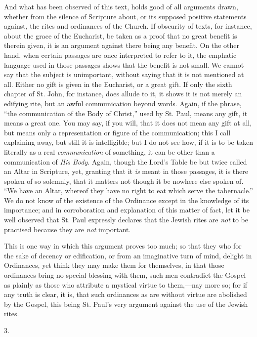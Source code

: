 And what has been observed of this text, holds good of all
arguments drawn, whether from the silence of Scripture about, or its
supposed positive statements against, the rites and ordinances of the
Church. If obscurity of texts, for instance, about the grace of the
Eucharist, be taken as a proof that no great benefit is therein given,
it is an argument against there being any benefit. On the other
hand, when certain passages are once interpreted to refer to it, the
emphatic language used in those passages shows that the benefit is not
small. We cannot say that the subject is unimportant, without saying
that it is not mentioned at all. Either no gift is given in the
Eucharist, or a great gift. If only the sixth chapter of St. John, for
instance, does allude to it, it shows it is not merely an edifying
rite, but an awful communication beyond words. Again, if the phrase,
``the communication of the Body of Christ,'' used by St. Paul,
means any gift, it means a great one. You may say, if you will, that
it does not mean any gift at all, but means only a representation or
figure of the communication; this I call explaining away, but still it
is intelligible; but I do not see how, if it is to be taken literally
as a real \emph{communication} of something, it can be other than a
communication of \emph{His Body}. Again, though the Lord's Table be
but twice called an Altar in Scripture, yet, granting that it \emph{is}
meant in those passages, it is there spoken of so solemnly, that it
matters not though it be nowhere else spoken of. ``We have an
Altar, whereof they have no right to eat which serve the
tabernacle.'' We do not know of the existence of the Ordinance
except in the knowledge of its importance; and in corroboration and
explanation of this matter of fact, let it be well observed that St.
Paul expressly declares that the Jewish rites are \emph{not} to be
practised because they are \emph{not} important.

This is one way in which this argument proves too much; so that
they who for the sake of decency or edification, or from an
imaginative turn of mind, delight in Ordinances, yet think they may
make them for themselves, in that those ordinances bring no special
blessing with them, such men contradict the Gospel as plainly as those who attribute a mystical virtue to them,—nay more so; for if
any truth is clear, it is, that such ordinances as are without virtue
are abolished by the Gospel, this being St. Paul's very argument
against the use of the Jewish rites.

3.

